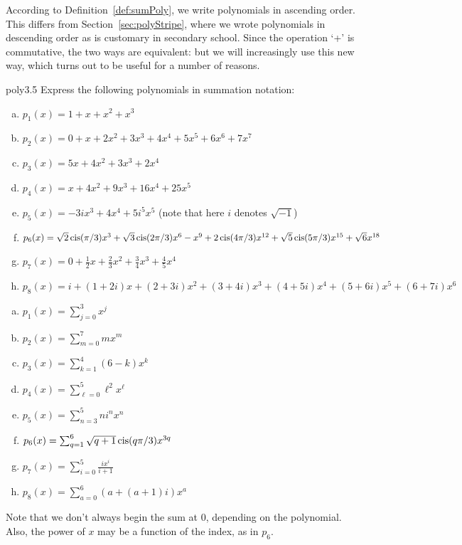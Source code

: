 \begin{rem}
According to  Definition~\ref{def:sumPoly}, we write polynomials in ascending order. This differs from Section~\ref{sec:polyStripe}, where we wrote polynomials in descending order as is customary in secondary school. Since the operation `+'  is commutative, the two ways are equivalent: but we will increasingly use this new way, which turns out to be useful for a number of reasons. 
\end{rem}

 \begin{example}{poly3.5} Express the following polynomials in summation notation:
\begin{enumerate}[(a)]
\item
$p_1(x)=1 + x+x^2+x^3$
\item
$p_2(x)=0 + x+2x^2+3x^3+4x^4+5x^5+6x^6+7x^7$
\item
$p_3(x)=5 x+4x^2+3x^3+2x^4 $
\item
$p_4(x)=x+4x^2+9x^3+16x^4+25x^5$
\item
$p_5(x)=-3ix^3+4x^4+5i^5x^5$ (note that here $i$ denotes $\sqrt{-1}$)
\item
$p_6(x)=\sqrt{2}\operatorname{cis}(\pi/3)x^3+\sqrt{3}\operatorname{cis}(2\pi/3)x^6-x^9 + 2\operatorname{cis}(4\pi/3)x^{12} + \sqrt{5}\operatorname{cis}(5\pi/3)x^{15} + \sqrt{6}x^{18}$ 
\item
$p_7(x)=0+\frac{1}{2}x+\frac{2}{3}x^2+\frac{3}{4}x^3+\frac{4}{5}x^4$
\item
$p_8(x)=i+(1+2i)x+(2+3i)x^2+(3+4i)x^3+(4+5i)x^4+(5+6i)x^5+(6+7i)x^6$
\end{enumerate}
 

\begin{enumerate}[(a)]
\item
$p_1(x)  = \sum_{j=0}^{3} x^j$
\item
$p_2(x)=\sum_{m=0}^{7} mx^m$
\item
$p_3(x)=\sum_{k=1}^{4} (6-k)x^k $
\item
$p_4(x)=\sum_{\ell=0}^{5} \ell^2x^\ell$
\item
$p_5(x)  = \sum_{n=3}^{5}ni^nx^n$
\item
$p_6(x) = \sum_{q=1}^{6}\sqrt{q+1}\operatorname{cis}(q\pi/3)x^{3q}$
\item
$p_7(x) = \sum_{i=0}^{5}\frac{ix^i}{i+1}$
\item
$p_8(x) = \sum_{a=0}^{6}(a+(a+1)i)x^a$
\end{enumerate}

Note that we don't always begin the sum at 0, depending on the polynomial. Also, the power of $x$ may be a function of the index, as in $p_6$.

\end{example}

